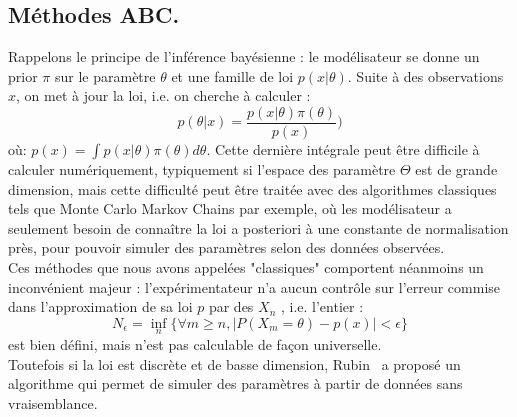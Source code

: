 \documentclass{article}
\theoremstyle{definition}
\begin{document}
\subsection{Méthodes ABC.}

Rappelons le principe de l'inférence bayésienne : le modélisateur se donne un prior $\pi$ sur le paramètre $\theta$ et une famille de loi $p(x|\theta)$. Suite à des observations $x$, on met à jour la loi, i.e. on cherche à calculer :
\[p(\theta|x)=\frac{p(x|\theta)\pi(\theta)}{p(x)})\]
où: $p(x)=\int p(x|\theta)\pi(\theta) d\theta$. Cette dernière intégrale peut être difficile à calculer numériquement, typiquement si l'espace des paramètre $\Theta$ est de grande dimension, mais cette difficulté peut être traitée avec des algorithmes classiques tels que Monte Carlo Markov Chains par exemple, où les modélisateur a seulement besoin de connaître la loi a posteriori à une constante de normalisation près, pour pouvoir simuler des paramètres selon des données observées.\\

Ces méthodes que nous avons appelées "classiques" comportent néanmoins un inconvénient majeur : l'expérimentateur n'a aucun contrôle sur l'erreur commise dans l'approximation de sa loi $p$ par des $X_n$ , i.e. l'entier :
\[N_\epsilon = \inf_{n}\{\forall m\geq n,|P(X_m=\theta)-p(x)|<\epsilon\}\]
est bien défini, mais n'est pas calculable de façon universelle. \\

Toutefois si la loi est discrète et de basse dimension, Rubin~\cite{Beaumont} a proposé un algorithme qui permet de simuler des paramètres à partir de données sans vraisemblance.\\

\\
\\
\end{document}
